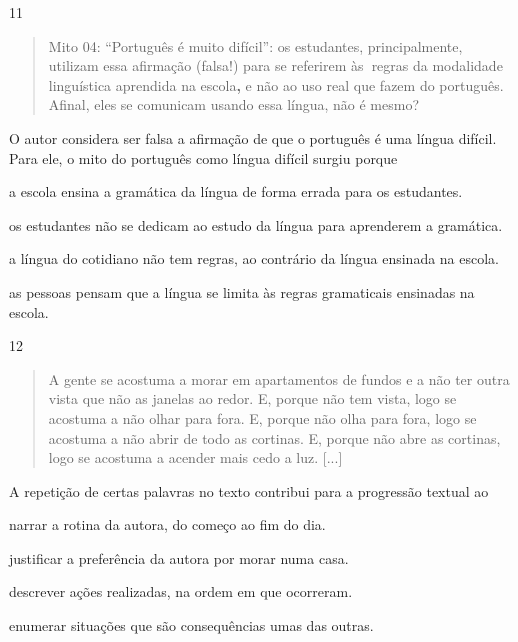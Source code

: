 \num{11}

\begin{quote}
Mito 04: ``Português é muito difícil'': os estudantes, principalmente,
utilizam essa afirmação (falsa!) para se referirem às\textbf{~}regras da
modalidade linguística aprendida na escola\textbf{,} e não ao uso real
que fazem do português. Afinal, eles se comunicam usando essa língua,
não é mesmo?
\end{quote}


O autor considera ser falsa a afirmação de que o português é uma língua
difícil. Para ele, o mito do português como língua difícil surgiu porque

\begin{escolha}
\item a escola ensina a gramática da língua de forma errada para os
estudantes.

\item os estudantes não se dedicam ao estudo da língua para aprenderem a
gramática.

\item a língua do cotidiano não tem regras, ao contrário da língua ensinada
na escola.

\item as pessoas pensam que a língua se limita às regras gramaticais
ensinadas na escola.
\end{escolha}

\num{12}

\begin{quote}
A gente se acostuma a morar em apartamentos de fundos e a não ter outra
vista que não as janelas ao redor. E, porque não tem vista, logo se
acostuma a não olhar para fora. E, porque não olha para fora, logo se
acostuma a não abrir de todo as cortinas. E, porque não abre as
cortinas, logo se acostuma a acender mais cedo a luz. {[}...{]}
\end{quote}


A repetição de certas palavras no texto contribui para a progressão
textual ao

\begin{escolha}
\item narrar a rotina da autora, do começo ao fim do dia.

\item justificar a preferência da autora por morar numa casa.

\item descrever ações realizadas, na ordem em que ocorreram.

\item enumerar situações que são consequências umas das outras.
\end{escolha}

